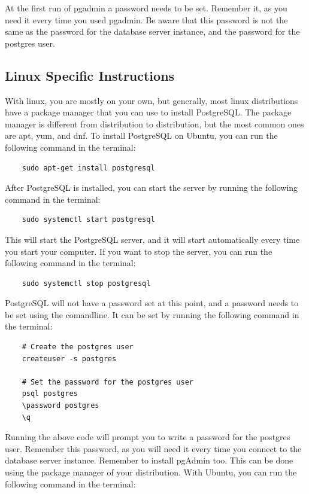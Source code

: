 At the first run of pgadmin a password needs to be set. Remember it, as you need it every time you used pgadmin. Be aware that this password is not the same as the password for the database server instance, and the password for the postgres user.


\subsection{Linux Specific Instructions}
With linux, you are mostly on your own, but generally, most linux distributions have a package manager that you can use to install PostgreSQL. The package manager is different from distribution to distribution, but the most common ones are apt, yum, and dnf. To install PostgreSQL on Ubuntu, you can run the following command in the terminal:

\begin{verbatim}
    sudo apt-get install postgresql
\end{verbatim}

After PostgreSQL is installed, you can start the server by running the following command in the terminal:

\begin{verbatim}
    sudo systemctl start postgresql
\end{verbatim}

This will start the PostgreSQL server, and it will start automatically every time you start your computer. If you want to stop the server, you can run the following command in the terminal:

\begin{verbatim}
    sudo systemctl stop postgresql
\end{verbatim}

PostgreSQL will not have a password set at this point, and a password needs to be set using the comandline. It can be set by running the following command in the terminal:

\begin{verbatim}
    # Create the postgres user
    createuser -s postgres

    # Set the password for the postgres user
    psql postgres
    \password postgres
    \q
\end{verbatim}

Running the above code will prompt you to write a password for the postgres user. Remember this password, as you will need it every time you connect to the database server instance. 
Remember to install pgAdmin too. This can be done using the package manager of your distribution. With Ubuntu, you can run the following command in the terminal:

